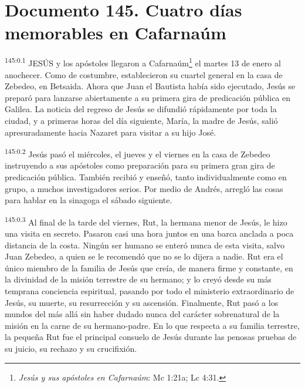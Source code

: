 \chapter{Documento 145. Cuatro días memorables en Cafarnaúm}
\par
\textsuperscript{145:0.1} JESÚS y los apóstoles llegaron a Cafarnaúm\footnote{\textit{Jesús y sus apóstoles en Cafarnaúm}: Mc 1:21a; Lc 4:31.} el martes 13 de enero al anochecer. Como de costumbre, establecieron su cuartel general en la casa de Zebedeo, en Betsaida. Ahora que Juan el Bautista había sido ejecutado, Jesús se preparó para lanzarse abiertamente a su primera gira de predicación pública en Galilea. La noticia del regreso de Jesús se difundió rápidamente por toda la ciudad, y a primeras horas del día siguiente, María, la madre de Jesús, salió apresuradamente hacia Nazaret para visitar a su hijo José.

\par
\textsuperscript{145:0.2} Jesús pasó el miércoles, el jueves y el viernes en la casa de Zebedeo instruyendo a sus apóstoles como preparación para su primera gran gira de predicación pública. También recibió y enseñó, tanto individualmente como en grupo, a muchos investigadores serios. Por medio de Andrés, arregló las cosas para hablar en la sinagoga el sábado siguiente.

\par
\textsuperscript{145:0.3} Al final de la tarde del viernes, Rut, la hermana menor de Jesús, le hizo una visita en secreto. Pasaron casi una hora juntos en una barca anclada a poca distancia de la costa. Ningún ser humano se enteró nunca de esta visita, salvo Juan Zebedeo, a quien se le recomendó que no se lo dijera a nadie. Rut era el único miembro de la familia de Jesús que creía, de manera firme y constante, en la divinidad de la misión terrestre de su hermano; y lo creyó desde su más temprana conciencia espiritual, pasando por todo el ministerio extraordinario de Jesús, su muerte, su resurrección y su ascensión. Finalmente, Rut pasó a los mundos del más allá sin haber dudado nunca del carácter sobrenatural de la misión en la carne de su hermano-padre. En lo que respecta a su familia terrestre, la pequeña Rut fue el principal consuelo de Jesús durante las penosas pruebas de su juicio, su rechazo y su crucifixión.

